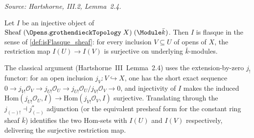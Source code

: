 \begin{lemma}
  \label{lem:isFlasque_injective}
  \textit{Source: Hartshorne, III.2, Lemma~2.4.}

  Let \(I\) be an injective object of
  \(\mathrm{Sheaf}\;(\Opens.\mathtt{grothendieckTopology}\;X)\;
  (\Module \bar k)\). Then \(I\) is flasque in the sense of
  \cref{def:isFlasque_sheaf}: for every inclusion \(V \subseteq U\) of
  opens of \(X\), the restriction map
  \(I(U) \to I(V)\) is surjective on underlying \(\bar k\)-modules.

  The classical argument (Hartshorne~III~Lemma~2.4) uses the
  extension-by-zero \(j_!\) functor: for an open inclusion
  \(j_V \colon V \hookrightarrow X\), one has the short exact sequence
  \(0 \to j_{V!}\mathcal O_V \to j_{U!}\mathcal O_U \to
  j_{U!}\mathcal O_U / j_{V!}\mathcal O_V \to 0\), and injectivity of
  \(I\) makes the induced
  \(\mathrm{Hom}(j_{U!}\mathcal O_U, I) \to
    \mathrm{Hom}(j_{V!}\mathcal O_V, I)\) surjective. Translating
  through the \(j_{(-)!} \dashv j_{(-)}^*\) adjunction (or the
  equivalent presheaf form for the constant ring sheaf \(\bar k\))
  identifies the two Hom-sets with \(I(U)\) and \(I(V)\) respectively,
  delivering the surjective restriction map.
\end{lemma}

